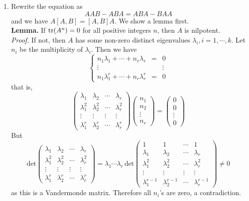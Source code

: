 \begin{enumerate}
    
    \item Rewrite the equation as 
    \[
    AAB - ABA =	ABA - BAA
    \]
    and we have $A[A,B] = [A,B]A$. We show a lemma first. \\
    \textbf{Lemma. } If $\operatorname{tr}(A^n)=0$ for all positive integers $n$, then $A$ is nilpotent. \\
    \textit{Proof.} If not, then $A$ has some non-zero distinct eigenvalues $\lambda_i, i = 1, \cdots ,k$. Let $n_i$ be the multiplicity of $\lambda_i$. Then we have
    \[
    \left\{\begin{array}{ccc}
    n_1\lambda_1+\cdots+n_r\lambda_r&=&0 \\ 
    \vdots &  & \vdots \\ 
    n_1\lambda_1^r+\cdots+n_r\lambda_r^r&=&0
    \end{array}\right.
    \]
    that is, 
    \[
    \left(\begin{array}{cccc}\lambda_1&\lambda_2&\cdots&\lambda_r\\\lambda_1^2 & \lambda_2^2 & \cdots & \lambda_r^2 \\ \vdots & \vdots & \vdots & \vdots \\ \lambda_1^r & \lambda_2^r & \cdots & \lambda_r^r\end{array}\right)\left(\begin{array}{c}n_1 \\ n_2 \\ \vdots \\ n_r \end{array}\right)=\left(\begin{array}{c}0 \\ 0\\ \vdots \\ 0\end{array}\right)	
    \]
    But 
    \[
    \mathrm{det}\left(\begin{array}{cccc}\lambda_1&\lambda_2&\cdots&\lambda_r\\\lambda_1^2 & \lambda_2^2 & \cdots & \lambda_r^2 \\ \vdots & \vdots & \vdots & \vdots \\ \lambda_1^r & \lambda_2^r & \cdots & \lambda_r^r\end{array}\right)=\lambda_1\cdots\lambda_r\,\mathrm{det}\left(\begin{array}{cccc} 1 & 1 & \cdots & 1 \\ \lambda_1&\lambda_2&\cdots&\lambda_r\\\lambda_1^2 & \lambda_2^2 & \cdots & \lambda_r^2 \\ \vdots & \vdots & \vdots & \vdots \\ \lambda_1^{r-1} & \lambda_2^{r-1} & \cdots & \lambda_r^{r-1}\end{array}\right)\neq 0
    \]
    as this is a Vandermonde matrix. Therefore all $n_i$'s are zero, a contradiction.


\end{enumerate}
